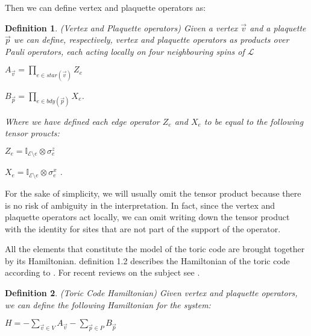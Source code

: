 \documentclass{Configuration_Files/PoliMi3i_thesis}
\newtheorem{definition}{Definition}[chapter]
\begin{document}
Then we can define vertex and plaquette operators as:

\begin{definition} (Vertex and Plaquette operators) Given a vertex $\vec{v}$ and a plaquette $\vec{p}$ we can define, respectively, vertex and plaquette operators as products over Pauli operators, each acting locally on four neighbouring spins of $\mathcal{L}$
	
\begin{center}
	$ A_{\vec{v}} = \prod_{e \in star(\vec{v})} Z_e $ 
	
	$ B_{\vec{p}} = \prod_{e \in bdy(\vec{p})} X_e $.
\end{center}

Where we have defined each edge operator $Z_e$ and $X_e$ to be equal to the following tensor proucts:

\begin{center}
	
	$Z_e = \mathbb{I}_{\mathcal{E} \setminus  e} \otimes \sigma^z_{e}$ 
	
	$X_e = \mathbb{I}_{\mathcal{E} \setminus  e} \otimes \sigma^x_{e} $ .
	
\end{center}
\end{definition}

For the sake of simplicity, we will usually omit the tensor product because there is no risk of ambiguity in the interpretation. In fact, since the vertex and plaquette operators act locally, we can omit writing down the tensor product with the identity for sites that are not part of the support of the operator. 
 



All the elements that constitute the model of the toric code are brought together by its Hamiltonian. definition 1.2 describes the Hamiltonian of the toric code 
{according to \cite{Kit02}}. For recent reviews on the subject see \cite{Her20}.

\begin{definition} (Toric Code Hamiltonian) Given vertex and plaquette operators, we can define the following Hamiltonian for the system:
\end{definition}

\begin{center}
	
	$H = -\sum_{\vec{v} \in V}
	A_{\vec{v}} - \sum_{\vec{p} \in P} B_{\vec{p}} $
	
\end{center}
\end{document}
